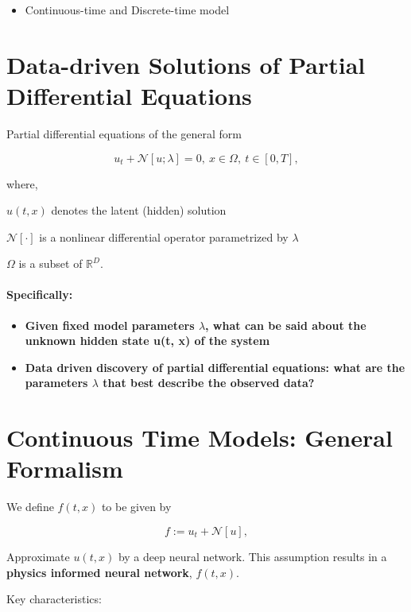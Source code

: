 \documentclass[book.tex]{subfiles}
\begin{document}
\begin{itemize}
\itemsep1pt\parskip0pt
\item
  Continuous-time and Discrete-time model
\end{itemize}

\section{Data-driven Solutions of Partial Differential
Equations}\label{data-driven-solutions-of-partial-differential-equations}

Partial differential equations of the general form

\[
u_t + \mathcal{N}[u;\lambda] = 0,\ x \in \Omega, \ t\in[0,T],
\]

where,

$u(t,x)$ denotes the latent (hidden) solution

$\mathcal{N}[\cdot]$ is a nonlinear differential operator parametrized
by $\lambda$

$\Omega$ is a subset of $\mathbb{R}^D$.

\paragraph{Specifically:}\label{specifically}

\begin{itemize}
\itemsep1pt\parskip0pt
\item
  \textbf{Given fixed model parameters $\lambda$, what can be said about the
  unknown hidden state u(t, x) of the system}
\item
  \textbf{Data driven discovery of partial differential equations: what
  are the parameters $\lambda$ that best describe the observed data?}
\end{itemize}

\section{Continuous Time Models: General
Formalism}\label{continuous-time-models-general-formalism}

We define $f(t,x)$ to be given by

\[
f := u_t + \mathcal{N}[u],
\]

Approximate $u(t,x)$ by a deep neural network. This assumption results
in a \textbf{physics informed neural network}, $f(t,x)$.

Key characteristics:
\end{document}
